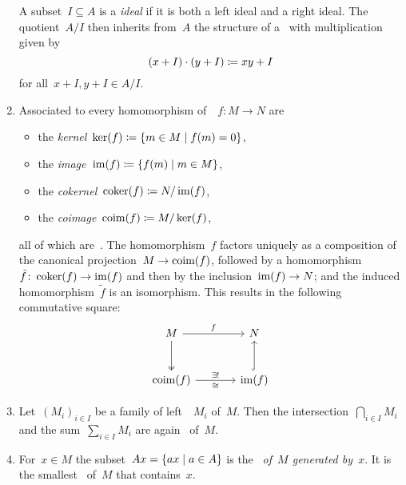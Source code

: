\begin{remarkdefinition}
\begin{enumerate}
      A subset~$I \subseteq A$ is a \emph{{\twosided} ideal} if it is both a left ideal and a right ideal.
      The quotient~$A/I$ then inherits from~$A$ the structure of a~{\kalg} with multiplication given by
      \[
                  (x + I) \cdot (y + I)
        \coloneqq  xy + I
      \]
      for all~$x + I, y + I \in A/I$.
    \item
      Associated to every homomorphism of~{}~$f \colon M \to N$ are
      \begin{itemize}
        \item
          the \emph{kernel}~$\ker(f) \defined \{m \in M \suchthat f(m) = 0\}$,
        \item
          the \emph{image}~$\im(f) \defined \{f(m) \suchthat m \in M\}$,
        \item
          the \emph{cokernel}~$\operatorname{coker}(f) \coloneqq N/\operatorname{im}(f)$,
        \item
          the \emph{coimage}~$\operatorname{coim}(f) \coloneqq M/\ker(f)$,
      \end{itemize}
      all of which are~{}.
      The homomorphism~$f$ factors uniquely as a composition of the canonical projection~$M \to \operatorname{coim}(f)$, followed by a homomorphism~$\tilde{f} \colon \operatorname{coker}(f) \to \operatorname{im}(f)$ and then by the inclusion~$\operatorname{im}(f) \to N$; and the induced homomorphism~$\tilde{f}$ is an isomorphism.
      This results in the following commutative square:
      \[
        \begin{tikzcd}[sep = large]
            M
            \arrow{r}[above]{f}
            \arrow[two heads]{d}
          & N
          \\
            \coim(f)
            \arrow{r}[above]{\exists!}[below]{\cong}
          & \im(f)
            \arrow[hook]{u}
        \end{tikzcd}
      \]
    \item
      Let~$(M_i)_{i \in I}$ be a family of left~{}~$M_i$ of~$M$.
      Then the intersection~$\bigcap_{i \in I} M_i$ and the sum~$\sum_{i \in I} M_i$ are again~{} of~$M$.
    \item
      For~$x \in M$ the subset~$Ax = \{ax \suchthat a \in A\}$ is the~\emph{{} of~$M$ generated by~$x$}.
      It is the smallest~{} of~$M$ that contains~$x$.

\end{enumerate}
\end{remarkdefinition}
